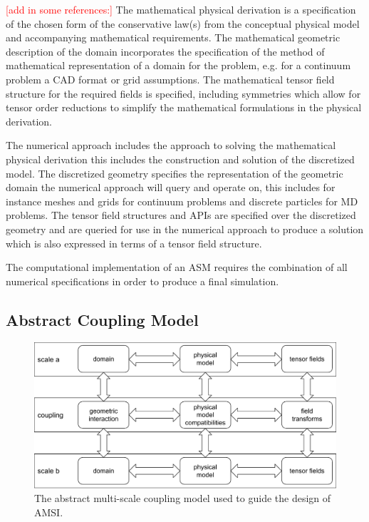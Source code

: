 \documentclass[review]{siamart1116}
\newcommand{\red}[1]{\textcolor{red}{[#1]}}
\begin{document}
\red{add in some references:}
The mathematical physical derivation is a specification of the chosen form of the conservative law(s) from the conceptual physical model and accompanying mathematical requirements. The mathematical geometric description of the domain incorporates the specification of the method of mathematical representation of a domain for the problem, e.g. for a continuum problem a CAD format or grid assumptions. The mathematical tensor field structure for the required fields is specified, including symmetries which allow for tensor order reductions to simplify the mathematical formulations in the physical derivation.

The numerical approach includes the approach to solving the mathematical physical derivation this includes the construction and solution of the discretized model. The discretized geometry specifies the representation of the geometric domain the numerical approach will query and operate on, this includes for instance meshes and grids for continuum problems and discrete particles for MD problems. The tensor field structures and APIs are specified over the discretized geometry and are queried for use in the numerical approach to produce a solution which is also expressed in terms of a tensor field structure. 

The computational implementation of an ASM requires the combination of all numerical specifications in order to produce a final simulation.

\subsection{Abstract Coupling Model}\label{sec:coupling-model}

\begin{figure}
  \centering
  \includegraphics[width=.9\columnwidth]{coupling-model-lines}
  \caption{The abstract multi-scale coupling model used to guide the design of AMSI.}
  \label{fig:coupling-model}
\end{figure}
\end{document}
